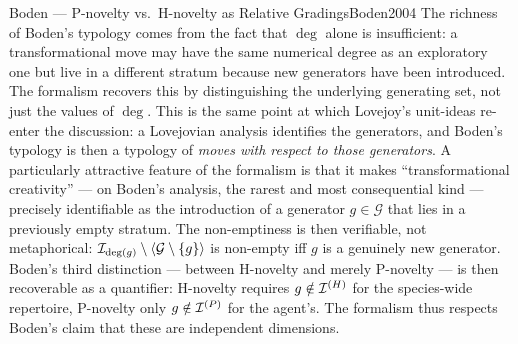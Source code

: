 \begin{zooentry}{Boden --- P-novelty vs.\ H-novelty as Relative Gradings}{Boden2004}
\litcomment The richness of Boden's typology comes from the fact that
$\deg$ alone is insufficient: a transformational move may have the
same numerical degree as an exploratory one but live in a different
stratum because new generators have been introduced. The formalism
recovers this by distinguishing the underlying generating set, not
just the values of $\deg$. This is the same point at which Lovejoy's
unit-ideas \cite{Lovejoy1936} re-enter the discussion: a Lovejovian
analysis identifies the generators, and Boden's typology is then a
typology of \emph{moves with respect to those generators}. A
particularly attractive feature of the formalism is that it makes
``transformational creativity'' --- on Boden's analysis, the rarest and
most consequential kind --- precisely identifiable as the introduction
of a generator $g\in\mathcal{G}$ that lies in a previously empty
stratum. The non-emptiness is then verifiable, not metaphorical:
$\mathcal{I}_{\deg(g)}\setminus\langle\mathcal{G}\setminus\{g\}\rangle$ is
non-empty iff $g$ is a genuinely new generator. Boden's third
distinction --- between H-novelty and merely P-novelty --- is then
recoverable as a quantifier: H-novelty requires $g\notin
\mathcal{I}^{(H)}$ for the species-wide repertoire, P-novelty only
$g\notin\mathcal{I}^{(P)}$ for the agent's. The formalism thus respects
Boden's claim that these are independent dimensions.
\end{zooentry}


